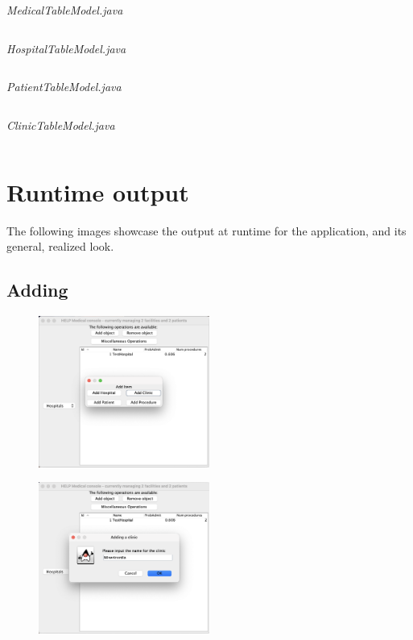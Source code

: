 \documentclass{article}
\begin{document}
\textit{MedicalTableModel.java}
\inputminted{java}{./src/main/java/com/yvesstraten/medicalconsolegui/models/MedicalTableModel.java}

\textit{HospitalTableModel.java}
\inputminted{java}{./src/main/java/com/yvesstraten/medicalconsolegui/models/HospitalTableModel.java}

\textit{PatientTableModel.java}
\inputminted{java}{./src/main/java/com/yvesstraten/medicalconsolegui/models/PatientTableModel.java}

\textit{ClinicTableModel.java}
\inputminted{java}{./src/main/java/com/yvesstraten/medicalconsolegui/models/ClinicTableModel.java}

\newpage 

\section{Runtime output}\label{sec:runtime_output} %
The following images showcase the output at runtime for the application, and its general, realized look.

\subsection{Adding}\label{sub:adding} %
\begin{figure}
  \begin{center}
    \includegraphics[width=0.5\textwidth]{./figures/Add/Clinic_1.png}
  \end{center}
\end{figure}

\begin{figure}
  \begin{center}
    \includegraphics[width=0.5\textwidth]{./figures/Add/Clinic_2.png}
  \end{center}
\end{figure}
\end{document}
